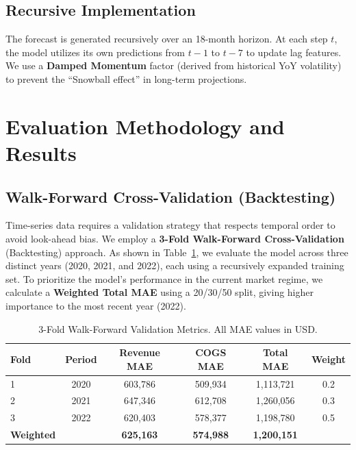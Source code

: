 \documentclass{article}
\begin{document}
\subsection{Recursive Implementation}
The forecast is generated recursively over an 18-month horizon. At each step $t$, the model utilizes its own predictions from $t-1$ to $t-7$ to update lag features. We use a \textbf{Damped Momentum} factor (derived from historical YoY volatility) to prevent the ``Snowball effect'' in long-term projections.

\section{Evaluation Methodology and Results}

\subsection{Walk-Forward Cross-Validation (Backtesting)}
Time-series data requires a validation strategy that respects temporal order to avoid look-ahead bias. We employ a \textbf{3-Fold Walk-Forward Cross-Validation} (Backtesting) approach. As shown in Table~\ref{tab:metrics}, we evaluate the model across three distinct years (2020, 2021, and 2022), each using a recursively expanded training set. To prioritize the model's performance in the current market regime, we calculate a \textbf{Weighted Total MAE} using a 20/30/50 split, giving higher importance to the most recent year (2022).

\begin{table}[h]
  \centering
  \caption{3-Fold Walk-Forward Validation Metrics. All MAE values in USD.}
  \label{tab:metrics}
  \begin{tabular}{@{}lccccc@{}}
    \toprule
    \textbf{Fold} & \textbf{Period} & \textbf{Revenue MAE} & \textbf{COGS MAE} & \textbf{Total MAE} & \textbf{Weight} \\
    \midrule
    1 & 2020 & 603,786 & 509,934 & 1,113,721 & 0.2 \\
    2 & 2021 & 647,346 & 612,708 & 1,260,056 & 0.3 \\
    3 & 2022 & 620,403 & 578,377 & 1,198,780 & 0.5 \\
    \midrule
    \textbf{Weighted} & & \textbf{625,163} & \textbf{574,988} & \textbf{1,200,151} & \\
    \bottomrule
  \end{tabular}
\end{table}
\end{document}
